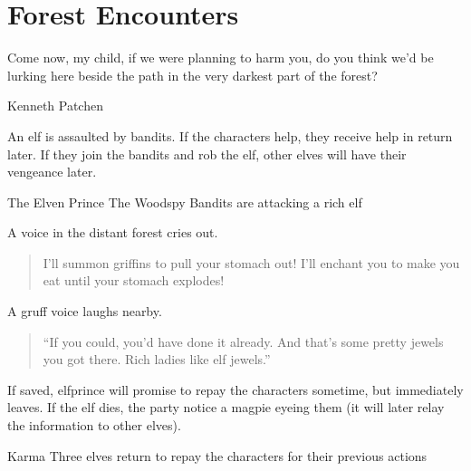 \section{Forest Encounters}

\epigraph{Come now, my child, if we were planning to harm you, do you think we'd be lurking here beside the path in the very darkest part of the forest?}{Kenneth Patchen}

\renewcommand{\sqarea}{Forest}

\begin{multicols}{2}

\resumecontents[Villages]
\label{littleprince}
\stopcontents[Villages]

\startcontents[sq]

\sqminitoc

\noindent
An elf is assaulted by bandits.
If the characters help, they receive help in return later.
If they join the bandits and rob the elf, other elves will have their vengeance later.

{The Elven Prince}%
{The Woodspy Bandits are attacking a rich elf}%

\begin{boxtext}
  A voice in the distant forest cries out.
  \begin{quote}
    I'll summon griffins to pull your stomach out!  I'll enchant you to make you eat until your stomach explodes!
  \end{quote}

  A gruff voice laughs nearby.

  \begin{quote}
    ``If you could, you'd have done it already.  And that's some pretty jewels you got there.  Rich ladies like elf jewels.''
  \end{quote}

\end{boxtext}


\elfprince

If saved, \gls{elfprince} will promise to repay the characters sometime, but immediately leaves.
If the elf dies, the party notice a magpie eyeing them (it will later relay the information to other elves).

{\squash Karma}%
{Three elves return to repay the characters for their previous actions}%


\end{multicols}
